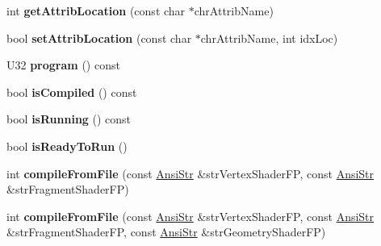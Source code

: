 \begin{DoxyCompactItemize}
\item 
\hypertarget{classps_1_1opengl_1_1GLShader_afdff2210c6029c0dc900cbec3e0f69bb}{}int {\bfseries get\+Attrib\+Location} (const char $\ast$chr\+Attrib\+Name)\label{classps_1_1opengl_1_1GLShader_afdff2210c6029c0dc900cbec3e0f69bb}

\item 
\hypertarget{classps_1_1opengl_1_1GLShader_a8fb24f449ca7a386647490eed4049823}{}bool {\bfseries set\+Attrib\+Location} (const char $\ast$chr\+Attrib\+Name, int idx\+Loc)\label{classps_1_1opengl_1_1GLShader_a8fb24f449ca7a386647490eed4049823}

\item 
\hypertarget{classps_1_1opengl_1_1GLShader_ae4c983ad63647d383826aa2be6f49881}{}U32 {\bfseries program} () const \label{classps_1_1opengl_1_1GLShader_ae4c983ad63647d383826aa2be6f49881}

\item 
\hypertarget{classps_1_1opengl_1_1GLShader_a774ba825995a749a8ea646abbc06f9c3}{}bool {\bfseries is\+Compiled} () const \label{classps_1_1opengl_1_1GLShader_a774ba825995a749a8ea646abbc06f9c3}

\item 
\hypertarget{classps_1_1opengl_1_1GLShader_add669d3fceee51498c58a813d89aad7d}{}bool {\bfseries is\+Running} () const \label{classps_1_1opengl_1_1GLShader_add669d3fceee51498c58a813d89aad7d}

\item 
\hypertarget{classps_1_1opengl_1_1GLShader_a8ff87e8e546a08f941bb7513e4a0e543}{}bool {\bfseries is\+Ready\+To\+Run} ()\label{classps_1_1opengl_1_1GLShader_a8ff87e8e546a08f941bb7513e4a0e543}

\item 
\hypertarget{classps_1_1opengl_1_1GLShader_ace4970f8e75f570375e7c7047280a8ee}{}int {\bfseries compile\+From\+File} (const \hyperlink{classps_1_1base_1_1CAString}{Ansi\+Str} \&str\+Vertex\+Shader\+F\+P, const \hyperlink{classps_1_1base_1_1CAString}{Ansi\+Str} \&str\+Fragment\+Shader\+F\+P)\label{classps_1_1opengl_1_1GLShader_ace4970f8e75f570375e7c7047280a8ee}

\item 
\hypertarget{classps_1_1opengl_1_1GLShader_adc66bc2de296f25005935a8166a308ac}{}int {\bfseries compile\+From\+File} (const \hyperlink{classps_1_1base_1_1CAString}{Ansi\+Str} \&str\+Vertex\+Shader\+F\+P, const \hyperlink{classps_1_1base_1_1CAString}{Ansi\+Str} \&str\+Fragment\+Shader\+F\+P, const \hyperlink{classps_1_1base_1_1CAString}{Ansi\+Str} \&str\+Geometry\+Shader\+F\+P)\label{classps_1_1opengl_1_1GLShader_adc66bc2de296f25005935a8166a308ac}


\end{DoxyCompactItemize}
